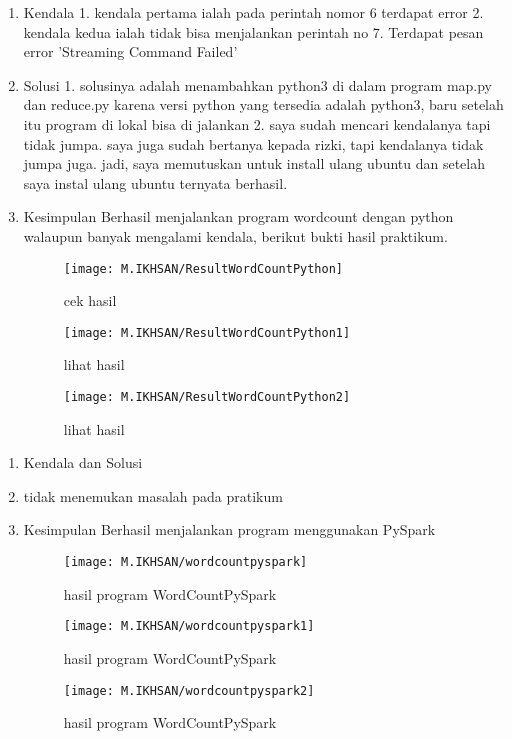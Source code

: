 \begin{enumerate}
\item Kendala  
1. kendala pertama ialah pada perintah nomor 6 terdapat error
2. kendala kedua ialah tidak bisa menjalankan perintah no 7. Terdapat pesan error 'Streaming Command Failed'

\item Solusi
1. solusinya adalah menambahkan python3 di dalam program map.py dan reduce.py karena versi python yang tersedia adalah python3, baru setelah itu program di lokal bisa di jalankan
2. saya sudah mencari kendalanya tapi tidak jumpa. saya juga sudah bertanya kepada rizki, tapi kendalanya tidak jumpa juga. jadi, saya memutuskan untuk install ulang ubuntu dan setelah saya instal ulang ubuntu ternyata berhasil.

\item Kesimpulan
Berhasil menjalankan program wordcount dengan python walaupun banyak mengalami kendala, berikut bukti hasil praktikum. 

\begin{figure}[!ht]
    \texttt{[image: M.IKHSAN/ResultWordCountPython]}
    \caption{cek hasil }
    \label{gam:hasil instalasi spark}
    \end{figure}
\begin{figure}[!ht]
    \texttt{[image: M.IKHSAN/ResultWordCountPython1]}
    \caption{lihat hasil}
    \label{gam:hasil instalasi spark}
    \end{figure}
\begin{figure}[!ht]
    \texttt{[image: M.IKHSAN/ResultWordCountPython2]}
    \caption{lihat hasil}
    \label{gam:hasil instalasi spark}
    \end{figure}
\end{enumerate}

\begin{enumerate}
\item Kendala dan Solusi
\item tidak menemukan masalah pada pratikum

\item Kesimpulan
Berhasil menjalankan program menggunakan PySpark

\begin{figure}[!ht]
    \texttt{[image: M.IKHSAN/wordcountpyspark]}
    \caption{hasil program WordCountPySpark }
    \label{gam:hasil instalasi spark}
    \end{figure}
\begin{figure}[!ht]
    \texttt{[image: M.IKHSAN/wordcountpyspark1]}
    \caption{hasil program WordCountPySpark }
    \label{gam:hasil instalasi spark}
    \end{figure}
\begin{figure}[!ht]
    \texttt{[image: M.IKHSAN/wordcountpyspark2]}
    \caption{hasil program WordCountPySpark }
    \label{gam:hasil instalasi spark}
    \end{figure}
\end{enumerate}